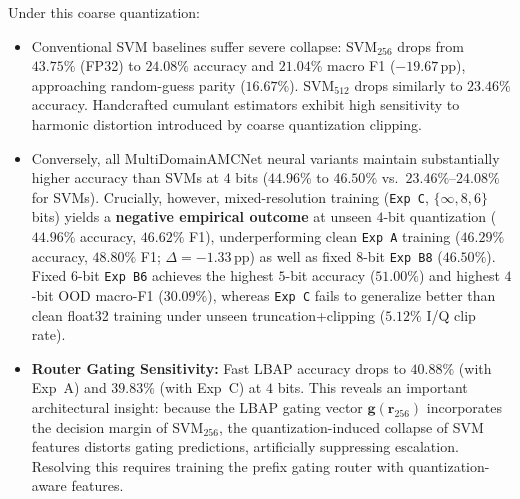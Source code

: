 Under this coarse quantization:
\begin{itemize}
    \item Conventional SVM baselines suffer severe collapse: $\mathrm{SVM}_{256}$ drops from $43.75\%$ (FP32) to $24.08\%$ accuracy and $21.04\%$ macro F1 ($-19.67\,\mathrm{pp}$), approaching random-guess parity ($16.67\%$). $\mathrm{SVM}_{512}$ drops similarly to $23.46\%$ accuracy. Handcrafted cumulant estimators exhibit high sensitivity to harmonic distortion introduced by coarse quantization clipping.
    \item Conversely, all $\mathrm{MultiDomainAMCNet}$ neural variants maintain substantially higher accuracy than SVMs at $4$ bits ($44.96\%$ to $46.50\%$ vs.\ $23.46\%$--$24.08\%$ for SVMs). Crucially, however, mixed-resolution training (\texttt{Exp C}, $\{\infty, 8, 6\}$ bits) yields a \textbf{negative empirical outcome} at unseen $4$-bit quantization ($44.96\%$ accuracy, $46.62\%$ F1), underperforming clean \texttt{Exp A} training ($46.29\%$ accuracy, $48.80\%$ F1; $\Delta = -1.33\,\mathrm{pp}$) as well as fixed $8$-bit \texttt{Exp B8} ($46.50\%$). Fixed $6$-bit \texttt{Exp B6} achieves the highest $5$-bit accuracy ($51.00\%$) and highest $4$-bit OOD macro-F1 ($30.09\%$), whereas \texttt{Exp C} fails to generalize better than clean float32 training under unseen truncation+clipping ($5.12\%$ I/Q clip rate).
    \item \textbf{Router Gating Sensitivity:} Fast LBAP accuracy drops to $40.88\%$ (with Exp~A) and $39.83\%$ (with Exp~C) at $4$ bits. This reveals an important architectural insight: because the LBAP gating vector $\mathbf{g}(\mathbf{r}_{256})$ incorporates the decision margin of $\mathrm{SVM}_{256}$, the quantization-induced collapse of SVM features distorts gating predictions, artificially suppressing escalation. Resolving this requires training the prefix gating router with quantization-aware features.
\end{itemize}
